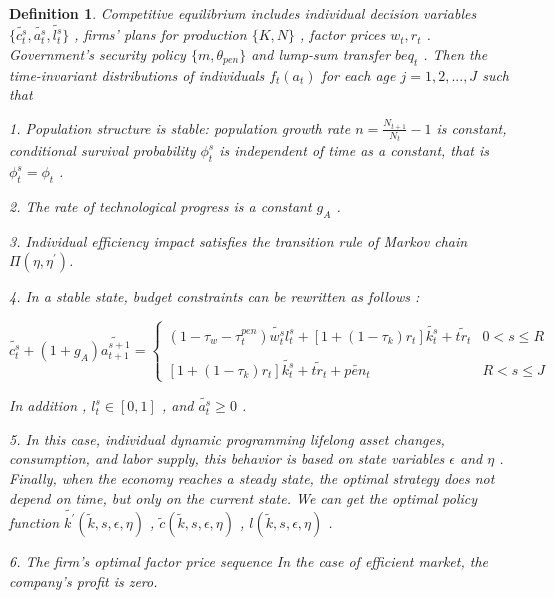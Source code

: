 \documentclass{article}
\newtheorem{definition}{Definition}[section]
\begin{document}
    \begin{definition}
        Competitive equilibrium includes individual decision variables $\{\tilde{c_t^s} , \tilde{a_t^s} , \tilde{l_t^s}\}$ , 
        firms' plans for production $\{K,N\}$ , factor prices ${w_t,r_t}$ . Government's security policy $\{m , \theta_{pen}\}$ and 
        lump-sum transfer $beq_t$ . Then the time-invariant distributions of individuals $f_t(a_t)$ for each age 
        $j=1,2,...,J$ such that 
        
        1. Population structure is stable: population growth rate $n=\frac{N_{t+1}}{N_{t}}-1$ is constant, 
        conditional survival probability $\phi_t^s$ is independent of time as a constant, that is $\phi_t^s=\phi_t$ .
        
        2. The rate of technological progress is a constant $g_A$ . 

        3. Individual efficiency impact satisfies the transition rule of Markov chain $\Pi(\eta,\eta^{'})$.

        4. In a stable state, budget constraints can be rewritten as follows :
        
        \begin{equation}
            \tilde{c_t^s}+(1+g_A)\tilde{a_{t+1}^{s+1}}=
            \begin{cases}
            (1-\tau_w-\tau_t^{pen})\tilde{w_t^s} l_t^s+[1+(1-\tau_k)r_t]\tilde{k_t^s}+\tilde{tr_t}& 0<s\leq R\\
            \\
            [1+(1-\tau_k)r_t]\tilde{k_t^s}+\tilde{tr_t}+\tilde{pen_t}& R<s\leq J
            \end{cases} 
        \end{equation}

        In addition , $l_t^s\in[0,1]$ , and $\tilde{a_t^s}\ge 0$ . 

        5. In this case, individual dynamic programming lifelong asset changes, consumption, and labor supply, this behavior is based on state variables 
        $\epsilon$ and $\eta$ . Finally, when the economy reaches a steady state, the optimal strategy does not depend on time, but only on the current state.
        We can get the optimal policy function $\tilde{k^{'}}(\tilde{k},s,\epsilon,\eta)$ , $\tilde{c}(\tilde{k},s,\epsilon,\eta)$ ,
        $l(\tilde{k},s,\epsilon,\eta)$ . 

        6. The firm's optimal factor price sequence In the case of efficient market, the company's profit is zero.


\end{definition}
\end{document}
